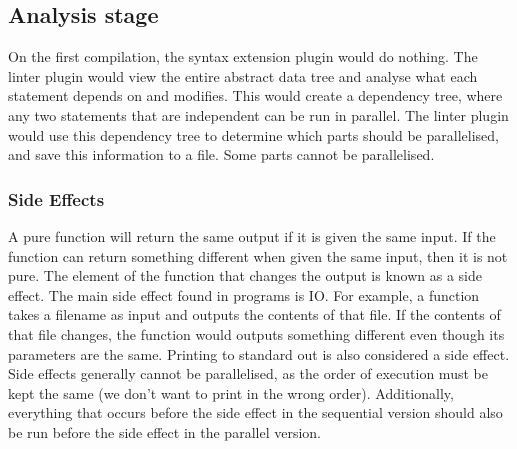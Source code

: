 \documentclass[conference]{IEEEtran}
\begin{document}
\subsection{Analysis stage}
On the first compilation, the syntax extension plugin would do nothing. The linter plugin would view the entire abstract data tree and analyse what each statement depends on and modifies. This would create a dependency tree, where any two statements that are independent can be run in parallel. The linter plugin would use this dependency tree to determine which parts should be parallelised, and save this information to a file. Some parts cannot be parallelised.

\subsubsection{Side Effects}
A pure function will return the same output if it is given the same input. If the function can return something different when given the same input, then it is not pure. The element of the function that changes the output is known as a side effect. The main side effect found in programs is IO. For example, a function takes a filename as input and outputs the contents of that file. If the contents of that file changes, the function would outputs something different even though its parameters are the same. Printing to standard out is also considered a side effect. Side effects generally cannot be parallelised, as the order of execution must be kept the same (we don't want to print in the wrong order). Additionally, everything that occurs before the side effect in the sequential version should also be run before the side effect in the parallel version.

\begin{comment}
The `ownership' memory model that Rust uses will help immensely with dependency analysis. Any variable will need to be cloned if they are going to be used in multiple threads at the same time. Mutable variables cannot be placed into separate threads, but immutable variables can.

The linter plugin receives each function one at a time. It checks the function arguments for mutable references.

Scans the function for any function calls. Adds them to a list of possible side effects. If the function has no side effects, and


\todo{Expand}
\end{comment}
\end{document}
